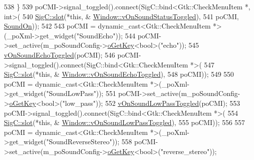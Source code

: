 \begin{DoxyCode}
{{538   \}
539   poCMI->signal\_toggled().connect(SigC::bind<Gtk::CheckMenuItem *, int>(
540                                     \mbox{\hyperlink{namespace_sig_c_a92e4f19202b77e78ac1db05f5a62f6b6}{SigC::slot}}(*\textcolor{keyword}{this}, &
      \mbox{\hyperlink{class_v_b_a_1_1_window_af883be4dc5fbd611a2b5610aa26cfff7}{Window::vOnSoundStatusToggled}}),
541                                     poCMI, \mbox{\hyperlink{class_v_b_a_1_1_window_a0d5c8ea46df2e5d53537db8aa5ecc175aa7efffeefb07fe04c5ad1f882b3d4f81}{SoundOn}}));
542 
543   poCMI = \textcolor{keyword}{dynamic\_cast<}Gtk::CheckMenuItem *\textcolor{keyword}{>}(\_poXml->get\_widget(\textcolor{stringliteral}{"SoundEcho"}));
544   poCMI->set\_active(m\_poSoundConfig->\mbox{\hyperlink{class_v_b_a_1_1_config_1_1_section_ab169d7aae4e9dde91418ba1668e3ad39}{oGetKey}}<\textcolor{keywordtype}{bool}>(\textcolor{stringliteral}{"echo"}));
545   \mbox{\hyperlink{class_v_b_a_1_1_window_acf58efc519acc8f3fd42b0e3481eff23}{vOnSoundEchoToggled}}(poCMI);
546   poCMI->signal\_toggled().connect(SigC::bind<Gtk::CheckMenuItem *>(
547                                     \mbox{\hyperlink{namespace_sig_c_a92e4f19202b77e78ac1db05f5a62f6b6}{SigC::slot}}(*\textcolor{keyword}{this}, &
      \mbox{\hyperlink{class_v_b_a_1_1_window_acf58efc519acc8f3fd42b0e3481eff23}{Window::vOnSoundEchoToggled}}),
548                                     poCMI));
549 
550   poCMI = \textcolor{keyword}{dynamic\_cast<}Gtk::CheckMenuItem *\textcolor{keyword}{>}(\_poXml->get\_widget(\textcolor{stringliteral}{"SoundLowPass"}));
551   poCMI->set\_active(m\_poSoundConfig->\mbox{\hyperlink{class_v_b_a_1_1_config_1_1_section_ab169d7aae4e9dde91418ba1668e3ad39}{oGetKey}}<\textcolor{keywordtype}{bool}>(\textcolor{stringliteral}{"low\_pass"}));
552   \mbox{\hyperlink{class_v_b_a_1_1_window_a424a694cc0b0e3cb750ed07457b2b11e}{vOnSoundLowPassToggled}}(poCMI);
553   poCMI->signal\_toggled().connect(SigC::bind<Gtk::CheckMenuItem *>(
554                                     \mbox{\hyperlink{namespace_sig_c_a92e4f19202b77e78ac1db05f5a62f6b6}{SigC::slot}}(*\textcolor{keyword}{this}, &
      \mbox{\hyperlink{class_v_b_a_1_1_window_a424a694cc0b0e3cb750ed07457b2b11e}{Window::vOnSoundLowPassToggled}}),
555                                     poCMI));
556 
557   poCMI = \textcolor{keyword}{dynamic\_cast<}Gtk::CheckMenuItem *\textcolor{keyword}{>}(\_poXml->get\_widget(\textcolor{stringliteral}{"SoundReverseStereo"}));
558   poCMI->set\_active(m\_poSoundConfig->\mbox{\hyperlink{class_v_b_a_1_1_config_1_1_section_ab169d7aae4e9dde91418ba1668e3ad39}{oGetKey}}<\textcolor{keywordtype}{bool}>(\textcolor{stringliteral}{"reverse\_stereo"}));
}}
\end{DoxyCode}
